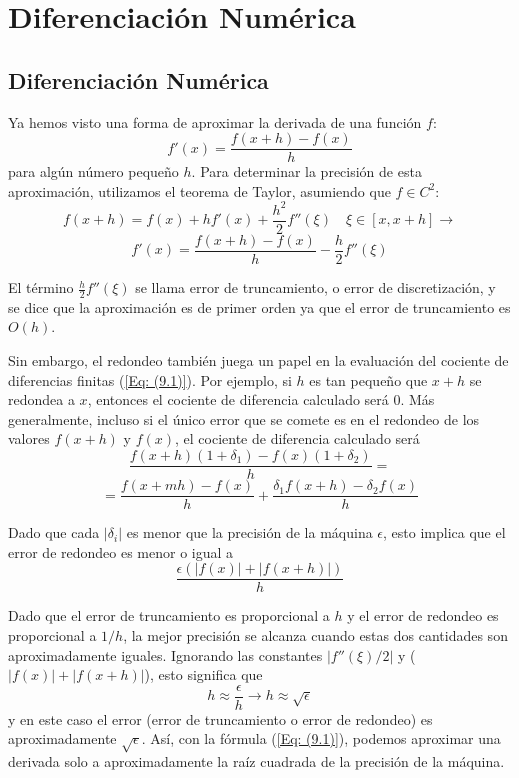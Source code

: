 \chapter{Diferenciación Numérica}

\section{Diferenciación Numérica}
Ya hemos visto una forma de aproximar la derivada de una función $f$:
\begin{equation}
    f'(x) = \frac{f(x + h) - f(x)}{h}
    \label{Eq: (9.1)}
\end{equation}
para algún número pequeño $h$. Para determinar la precisión de esta aproximación, utilizamos el teorema de Taylor, asumiendo que $f \in C^2$: 
\[ f(x + h) = f(x) + h f'(x) + \frac{h^2}{2} f''(\xi) \quad \xi \in [x, x+h] \rightarrow \]
\[ f'(x) = \frac{f(x + h) - f(x)}{h} - \frac{h}{2} f''(\xi)\]

El término $\frac{h}{2} f''(\xi)$ se llama error de truncamiento, o error de discretización, y se dice que la aproximación es de primer orden ya que el error de truncamiento es $O(h)$.

Sin embargo, el redondeo también juega un papel en la evaluación del cociente de diferencias finitas (\ref{Eq: (9.1)}). Por ejemplo, si $h$ es tan pequeño que $x + h$ se redondea a $x$, entonces el cociente de diferencia calculado será 0. Más generalmente, incluso si el único error que se comete es en el redondeo de los valores $f(x + h)$ y $f(x)$, el cociente de diferencia calculado será
\[ \frac{f(x + h) (1 + \delta_1) - f(x) (1 + \delta_2)}{h} = \]
\[ = \frac{f(x + mh) - f(x)}{h} + \frac{\delta_1 f(x + h) - \delta_2 f(x)}{h}\]

Dado que cada $|\delta_i|$ es menor que la precisión de la máquina $\epsilon$, esto implica que el error de redondeo es menor o igual a
\[ \frac{\epsilon(|f(x)| + |f(x + h)|)}{h} \] 

Dado que el error de truncamiento es proporcional a $h$ y el error de redondeo es proporcional a $1/h$, la mejor precisión se alcanza cuando estas dos cantidades son aproximadamente iguales. Ignorando las constantes $|f''(\xi)/2|$ y ($|f(x)| + |f(x + h)|$), esto significa que
\[ h \approx \frac{\epsilon}{h} \rightarrow h \approx \sqrt{\epsilon}\]
y en este caso el error (error de truncamiento o error de redondeo) es aproximadamente $\sqrt{\epsilon}$. Así, con la fórmula (\ref{Eq: (9.1)}), podemos aproximar una derivada solo a aproximadamente la raíz cuadrada de la precisión de la máquina.

